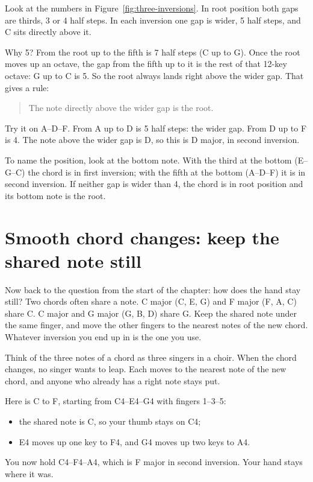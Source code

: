 Look at the numbers in Figure~\ref{fig:three-inversions}. In root position both gaps are thirds, 3 or 4 half steps. In each inversion one gap is wider, 5 half steps, and C sits directly above it.

Why 5? From the root up to the fifth is 7 half steps (C up to G). Once the root moves up an octave, the gap from the fifth up to it is the rest of that 12-key octave: G up to C is 5. So the root always lands right above the wider gap. That gives a rule:
\begin{quote}
The note directly above the wider gap is the root.
\end{quote}

Try it on A--D--F\sh. From A up to D is 5 half steps: the wider gap. From D up to F\sh{} is 4. The note above the wider gap is D, so this is D major, in second inversion. 

To name the position, look at the bottom note. With the third at the bottom (E--G--C) the chord is in first inversion; with the fifth at the bottom (A--D--F\sh) it is in second inversion. If neither gap is wider than 4, the chord is in root position and its bottom note is the root.

\section{Smooth chord changes: keep the shared note still}

Now back to the question from the start of the chapter: how does the hand stay still? Two chords often share a note. C major (C, E, G) and F major (F, A, C) share C. C major and G major (G, B, D) share G. Keep the shared note under the same finger, and move the other fingers to the nearest notes of the new chord. Whatever inversion you end up in is the one you use.

\begin{intuitionbox}
Think of the three notes of a chord as three singers in a choir. When the chord changes, no singer wants to leap. Each moves to the nearest note of the new chord, and anyone who already has a right note stays put.
\end{intuitionbox}

Here is C to F, starting from C4--E4--G4 with fingers 1--3--5:
\begin{itemize}
  \item the shared note is C, so your thumb stays on C4;
  \item E4 moves up one key to F4, and G4 moves up two keys to A4.
\end{itemize}
You now hold C4--F4--A4, which is F major in second inversion. Your hand stays where it was. 

